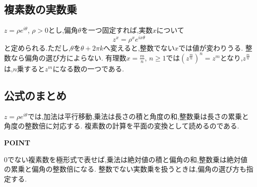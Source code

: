 \subsection{複素数の実数乗}\label{節：複素数の実数乗}
$z=\rho e^{i\theta}$, $\rho>0$とし,偏角$\theta$を一つ固定すれば,実数$x$について
\[
  z^x=\rho^x e^{ix\theta}
\]
と定められる.ただし,$\theta$を$\theta+2\pi k$へ変えると,整数でない$x$では値が変わりうる.
整数なら偏角の選び方によらない.
有理数$x=\frac{m}{n}$, $n\ge1$では$\left(z^{\frac{m}{n}}\right)^n=z^m$となり,$z^{\frac{m}{n}}$は,$n$乗すると$z^m$になる数の一つである.

\subsection{公式のまとめ}\label{節：公式のまとめ}
$z=\rho e^{i\theta}$では,加法は平行移動,乗法は長さの積と角度の和,整数乗は長さの累乗と角度の整数倍に対応する.
複素数の計算を平面の変換として読めるのである.

\begin{bookpoint}
  \textbf{POINT}\par
  0でない複素数を極形式で表せば,乗法は絶対値の積と偏角の和,整数乗は絶対値の累乗と偏角の整数倍になる.
  整数でない実数乗を扱うときは,偏角の選び方も指定する.
\end{bookpoint}
